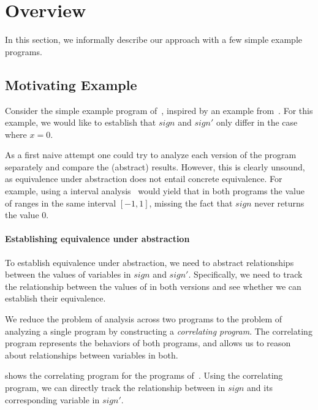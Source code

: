 \section{Overview}

In this section, we informally describe our approach with a few simple example programs.

\subsection{Motivating Example}



Consider the simple example program of~, inspired by an example from~\cite{RM:TOPLAS07}. For this example, we would like to establish that $sign$ and $sign'$ only differ in the case where $x=0$.

As a first naive attempt one could try to analyze each version of the program separately and compare the (abstract) results. However, this is clearly unsound, as equivalence under abstraction does not entail concrete equivalence. For example, using a interval analysis~\cite{TODO} would yield that in both programs the value of  ranges in the same interval $[-1,1]$, missing the fact that $sign$ never returns the value $0$.


\paragraph{Establishing equivalence under abstraction}
To establish equivalence under abstraction, we need to abstract relationships between the values of variables in $sign$ and $sign'$. Specifically, we need to track the relationship between the values of  in both versions and see whether we can establish their equivalence.

We reduce the problem of analysis across two programs to the problem of analyzing a single program by constructing a \emph{correlating program}. The correlating program represents the behaviors of both programs, and allows us to reason about relationships between variables in both. 



 shows the correlating program for the programs of~. Using the correlating program, we can directly track the relationship between  in $sign$ and its corresponding variable  in $sign'$. 

